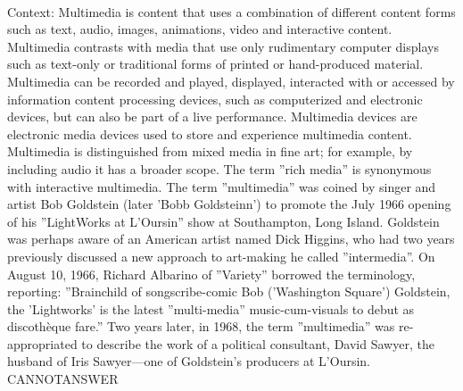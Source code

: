 \documentclass[11pt,a4paper, onecolumn]{article}
\begin{document}
\\ Context: Multimedia is content that uses a combination of different content forms such as text, audio, images, animations, video and interactive content. Multimedia contrasts with media that use only rudimentary computer displays such as text-only or traditional forms of printed or hand-produced material. Multimedia can be recorded and played, displayed, interacted with or accessed by information content processing devices, such as computerized and electronic devices, but can also be part of a live performance. Multimedia devices are electronic media devices used to store and experience multimedia content. Multimedia is distinguished from mixed media in fine art; for example, by including audio it has a broader scope. The term ''rich media'' is synonymous with interactive multimedia. The term ''multimedia'' was coined by singer and artist Bob Goldstein (later 'Bobb Goldsteinn') to promote the July 1966 opening of his ''LightWorks at L'Oursin'' show at Southampton, Long Island. Goldstein was perhaps aware of an American artist named Dick Higgins, who had two years previously discussed a new approach to art-making he called ''intermedia''. On August 10, 1966, Richard Albarino of ''Variety'' borrowed the terminology, reporting: ''Brainchild of songscribe-comic Bob ('Washington Square') Goldstein, the 'Lightworks' is the latest ''multi-media'' music-cum-visuals to debut as discothèque fare.'' Two years later, in 1968, the term ''multimedia'' was re-appropriated to describe the work of a political consultant, David Sawyer, the husband of Iris Sawyer—one of Goldstein's producers at L'Oursin. CANNOTANSWER
\end{document}
